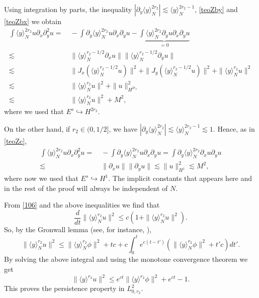 \documentclass[reqno]{amsart}
\numberwithin{equation}{section}
\begin{document}
Using integration by parts, the  inequality
$|\partial_{y}\langle y \rangle_{N}^{2r_2}|\lesssim \langle y \rangle_{N}^{2r_{2}-1}$,
\eqref{teoZby} and \eqref{teoZbx} we obtain
\begin{equation}\label{teoZc}
\begin{split}
\int \langle y \rangle_{N}^{2r_2}u\partial_{x}\partial_{y}^{2}u=&\ -\int
\partial_{y}\langle y \rangle_{N}^{2r_2}u\partial_{x}\partial_{y}u  -\underbrace{\int
\langle y \rangle_{N}^{2r_2}\partial_{y}u\partial_{x}\partial_{y}u}_{=0}\\
\lesssim& \
\|\langle y \rangle_{N}^{r_2-1/2}\partial_{x}u\|\|\langle y \rangle_{N}^{r_2-1/2}\partial_{y}u\|\\
 \lesssim &\ \|J_{x}(\langle y \rangle_{N}^{r_2-1/2}u)\|^2 +\|J_{y}(\langle y \rangle_{N}^{r_2-1/2}u)\|^2
+\|\langle y \rangle_{N}^{r_2}u\|^2\\ 
\lesssim & \ \|\langle y \rangle_{N}^{r_2}u\|^2 + \|u\|^2_{H^{2r_2}}\\
\lesssim &\ \|\langle y \rangle_{N}^{r_2}u\|^2+M^2,
\end{split}
\end{equation}
where we used that $E^s\hookrightarrow H^{2r_2}$. 

On the other hand, if $r_2\in(0,1/2]$, we have $|\partial_{y}\langle y \rangle_{N}^{2r_2}|\lesssim \langle y \rangle_{N}^{2r_{2}-1}\lesssim 1$. Hence, as in \eqref{teoZc},
\begin{equation*}
\begin{split}
\int \langle y \rangle_{N}^{2r_2}u\partial_{x}\partial_{y}^{2}u=&\ -\int
\partial_{y}\langle y \rangle_{N}^{2r_2}u\partial_{x}\partial_{y}u  =\int
	\partial_y\langle y \rangle_{N}^{2r_2}\partial_{x}u\partial_{y}u\\
\lesssim & \ 
\|\partial_{x}u\|\|\partial_{y}u\|\lesssim \|u\|^2_{H^1}\lesssim M^2,
\end{split}
\end{equation*}
where now we used that $E^s\hookrightarrow H^1$.
The  implicit constants that appears here and in the rest of the proof  will always be independent of $N$.

From \eqref{106} and the above inequalities  we find that
$$
\frac{d}{dt}\|\langle y \rangle_{N}^{r_2}u\|^{2}\leq c(1+\|\langle y \rangle_{N}^{r_2}u\|^{2}).
$$
So, by the Gronwall lemma (see, for instance, \cite[Theorem 12.3.3]{Hille}), 
$$
\|\langle y \rangle_{N}^{r_2}u\|^{2}\leq \|\langle y \rangle_{N}^{r_2}\phi\|^{2}+tc+c\int_{0}^{t}e^{c(t-t')}(\|\langle y \rangle_{N}^{r_2}\phi\|^{2}+t'c)dt'.
$$
By solving the above integral and using the monotone convergence theorem we get
\begin{equation*}
\|\langle y \rangle^{r_2}u\|^{2}\leq e^{ct}\|\langle y
\rangle^{r_2}\phi\|^{2}+e^{ct}-1.
\end{equation*}
This  proves the persistence property in $L^2_{0,r_2}$.
\end{document}
